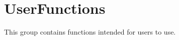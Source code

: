 \hypertarget{group___user_functions}{}\section{User\+Functions}
\label{group___user_functions}
This group contains functions intended for users to use. 